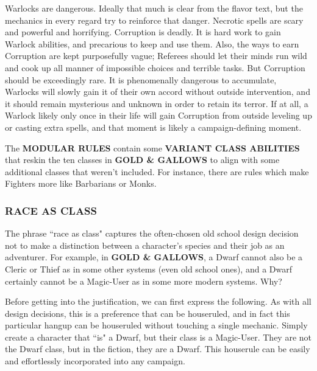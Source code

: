\documentclass[twoside]{article}
\begin{document}
\bigbreak

Warlocks are dangerous. Ideally that much is clear from the flavor text, but the mechanics in every regard try to reinforce that danger. Necrotic spells are scary and powerful and horrifying. Corruption is deadly. It is hard work to gain Warlock abilities, and precarious to keep and use them. Also, the ways to earn Corruption are kept purposefully vague; Referees should let their minds run wild and cook up all manner of impossible choices and terrible tasks. But Corruption should be exceedingly rare. It is phenomenally dangerous to accumulate, Warlocks will slowly gain it of their own accord without outside intervention, and it should remain mysterious and unknown in order to retain its terror. If at all, a Warlock likely only once in their life will gain Corruption from outside leveling up or casting extra spells, and that moment is likely a campaign-defining moment.

\bigbreak

The \textbf{MODULAR RULES} contain some \textbf{VARIANT CLASS ABILITIES} that reskin the ten classes in \textbf{GOLD \& GALLOWS} to align with some additional classes that weren't included. For instance, there are rules which make Fighters more like Barbarians or Monks.

\subsubsection*{\footnotesize{R}\scriptsize{ACE AS CLASS}\normalsize}

The phrase ``race as class" captures the often-chosen old school design decision not to make a distinction between a character's species and their job as an adventurer. For example, in \textbf{GOLD \& GALLOWS}, a Dwarf cannot also be a Cleric or Thief as in some other systems (even old school ones), and a Dwarf certainly cannot be a Magic-User as in some more modern systems. Why?

\bigbreak

Before getting into the justification, we can first express the following. As with all design decisions, this is a preference that can be houseruled, and in fact this particular hangup can be houseruled without touching a single mechanic. Simply create a character that ``is" a Dwarf, but their class is a Magic-User. They are not the Dwarf class, but in the fiction, they are a Dwarf. This houserule can be easily and effortlessly incorporated into any campaign.
\end{document}
